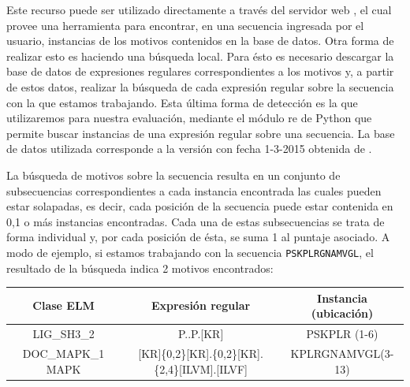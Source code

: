 Este recurso puede ser utilizado directamente a través del servidor web \cite{elmweb}, el cual provee una herramienta para encontrar, en una secuencia ingresada por el usuario, instancias de los motivos contenidos en la base de datos.
Otra forma de realizar esto es haciendo una búsqueda local. Para ésto es necesario descargar la base de datos de expresiones regulares correspondientes a los motivos y, 
a partir de estos datos, realizar la búsqueda de cada expresión regular sobre la secuencia con la que estamos trabajando.
Esta última forma de detección es la que utilizaremos para nuestra evaluación, mediante el módulo re de Python que permite buscar instancias de una expresión regular sobre una secuencia.
La base de datos utilizada corresponde a la versión con fecha 1-3-2015 obtenida de \cite{elmweb}.

La búsqueda de motivos sobre la secuencia resulta en un conjunto de subsecuencias correspondientes a cada instancia encontrada las cuales pueden estar solapadas, es decir, 
cada posición de la secuencia puede estar contenida en 0,1 o más instancias encontradas. 
Cada una de estas subsecuencias se trata de forma individual y, por cada posición de ésta, se suma 1 al puntaje asociado.
A modo de ejemplo, si estamos trabajando con la secuencia \texttt{PSKPLRGNAMVGL}, el resultado de la búsqueda indica 2 motivos encontrados:
% 
\vspace{0.5cm}

\noindent 
\begin{tabular}{c|c|c} 
\textbf{Clase ELM} & \textbf{Expresión regular} & \textbf{Instancia (ubicación)}\\ \hline
LIG\_SH3\_2 & P..P.[KR] & PSKPLR (1-6)\\ 
DOC\_MAPK\_1 MAPK  & [KR]\{0,2\}[KR].\{0,2\}[KR].\{2,4\}[ILVM].[ILVF] & KPLRGNAMVGL(3-13)
\end{tabular}

\vspace{0.5cm}

